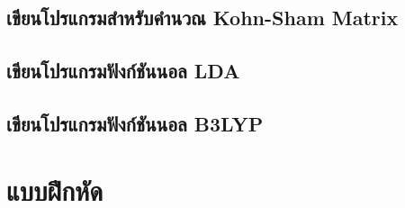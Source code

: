 \subsection{เขียนโปรแกรมสำหรับคำนวณ Kohn-Sham Matrix}

\subsection{เขียนโปรแกรมฟังก์ชันนอล LDA}

\subsection{เขียนโปรแกรมฟังก์ชันนอล B3LYP}

\section{แบบฝึกหัด}
